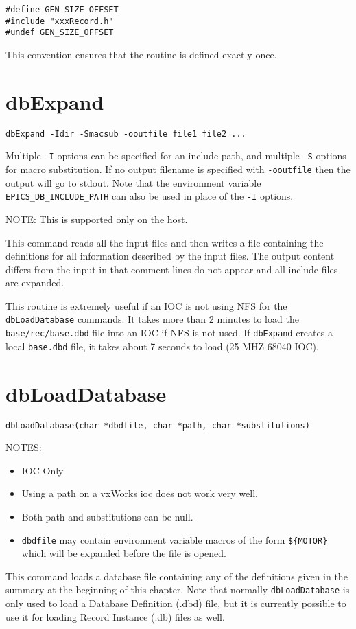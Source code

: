 \begin{verbatim}#define GEN_SIZE_OFFSET
#include "xxxRecord.h"
#undef GEN_SIZE_OFFSET
\end{verbatim}This convention ensures that the routine is defined exactly once.

\section{dbExpand}

\begin{verbatim}dbExpand -Idir -Smacsub -ooutfile file1 file2 ...
\end{verbatim}Multiple \verb|-I| options can be specified for an include path, and multiple \verb|-S| options for macro substitution. If no output 
filename is specified with \verb|-ooutfile| then the output will go to stdout. Note that the environment variable 
\verb|EPICS_DB_INCLUDE_PATH| can also be used in place of the \verb|-I| options.

NOTE: This is supported only on the host.

This command reads all the input files and then writes a file containing the definitions for all information described by the 
input files. The output content differs from the input in that comment lines do not appear and all include files are 
expanded.

This routine is extremely useful if an IOC is not using NFS for the \verb|dbLoadDatabase| commands. It takes more than 2 
minutes to load the \verb|base/rec/base.dbd| file into an IOC if NFS is not used. If \verb|dbExpand| creates a local \verb|base.dbd| 
file, it takes about 7 seconds to load (25 MHZ 68040 IOC).

\section{dbLoadDatabase}

\begin{verbatim}dbLoadDatabase(char *dbdfile, char *path, char *substitutions)
\end{verbatim}NOTES: 

\begin{itemize}\item IOC Only

\item Using a path on a vxWorks ioc does not work very well.

\item Both path and substitutions can be null.

\item \verb|dbdfile| may contain environment variable macros of the form \verb|${MOTOR}| which will be expanded before the 
file is opened.

\end{itemize}This command loads a database file containing any of the definitions given in the summary at the beginning of this 
chapter. Note that normally \verb|dbLoadDatabase| is only used to load a Database Definition (.dbd) file, but it is currently 
possible to use it for loading Record Instance (.db) files as well.

